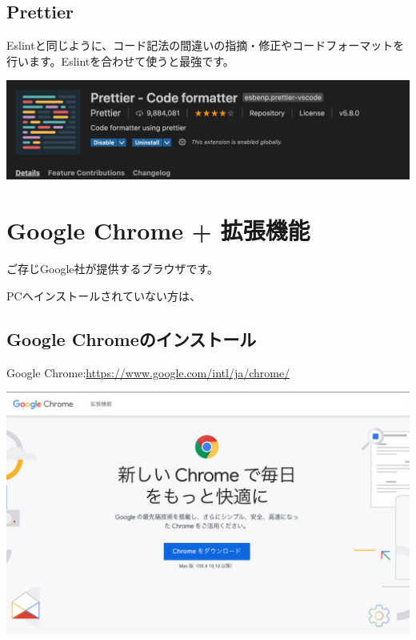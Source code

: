 \subsection{Prettier}
\keeplastskip{
  \label{sec:1-2-4}
  \par\nobreak
}

Eslintと同じように、コード記法の間違いの指摘・修正やコードフォーマットを行います。Eslintを合わせて使うと最強です。

\begin{reviewimage}[H]%
\includegraphics[width=1.0\maxwidth]{./images/01-createDevEnv/01_08vscodeExtension_prettier.png}%
\label{image:01-createDevEnv:01_08vscodeExtension_prettier}
\end{reviewimage}

\section{Google Chrome + 拡張機能}
\keeplastskip{
  \label{sec:1-3}
  \label{sec-chrome}
  \par\nobreak
}

ご存じGoogle社が提供するブラウザです。

PCへインストールされていない方は、\\[0pt]

\subsection{Google Chromeのインストール}
\keeplastskip{
  \label{sec:1-3-1}
  \par\nobreak
}

Google Chrome:\url{https://www.google.com/intl/ja/chrome/}

\begin{reviewimage}[H]%
\includegraphics[width=1.0\maxwidth]{./images/01-createDevEnv/01_09googleChrome.png}%
\label{image:01-createDevEnv:01_09googleChrome}
\end{reviewimage}

